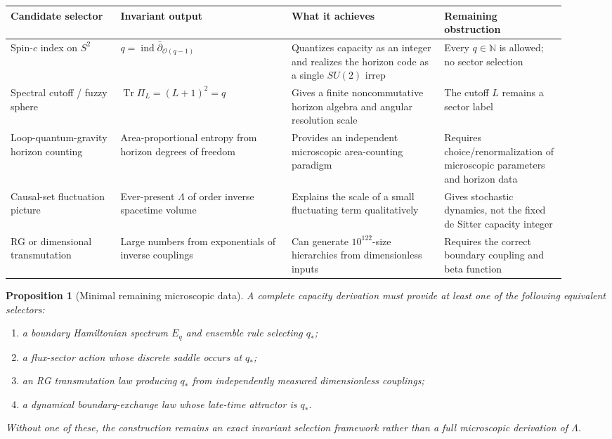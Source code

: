 \documentclass[aps,prd,reprint,nofootinbib,superscriptaddress,floatfix]{revtex4-2}
\numberwithin{equation}{section}
\theoremstyle{definition}
\theoremstyle{plain}
\newtheorem{proposition}{Proposition}[section]
\begin{document}
\begin{widetext}
\begin{center}
\footnotesize
\renewcommand{\arraystretch}{0.92}
\begin{tabular}{@{}p{0.18\linewidth}p{0.29\linewidth}p{0.25\linewidth}p{0.20\linewidth}@{}}
\toprule
Candidate selector & Invariant output & What it achieves & Remaining obstruction\\
\midrule
Spin-\(c\) index on \(S^2\) &
\(q=\operatorname{ind}\bar\partial_{\mathcal O(q-1)}\) &
Quantizes capacity as an integer and realizes the horizon code as a single \(SU(2)\) irrep &
Every \(q\in\mathbb N\) is allowed; no sector selection\\
Spectral cutoff / fuzzy sphere &
\(\operatorname{Tr}\Pi_L=(L+1)^2=q\) &
Gives a finite noncommutative horizon algebra and angular resolution scale &
The cutoff \(L\) remains a sector label\\
Loop-quantum-gravity horizon counting &
Area-proportional entropy from horizon degrees of freedom &
Provides an independent microscopic area-counting paradigm &
Requires choice/renormalization of microscopic parameters and horizon data\\
Causal-set fluctuation picture &
Ever-present \(\Lambda\) of order inverse spacetime volume &
Explains the scale of a small fluctuating term qualitatively &
Gives stochastic dynamics, not the fixed de Sitter capacity integer\\
RG or dimensional transmutation &
Large numbers from exponentials of inverse couplings &
Can generate \(10^{122}\)-size hierarchies from dimensionless inputs &
Requires the correct boundary coupling and beta function\\
\bottomrule
\end{tabular}
\end{center}
\end{widetext}

\begin{proposition}[Minimal remaining microscopic data]
A complete capacity derivation must provide at least one of the following equivalent selectors:
\begin{enumerate}
\item a boundary Hamiltonian spectrum \(E_q\) and ensemble rule selecting \(q_*\);
\item a flux-sector action whose discrete saddle occurs at \(q_*\);
\item an RG transmutation law producing \(q_*\) from independently measured dimensionless couplings;
\item a dynamical boundary-exchange law whose late-time attractor is \(q_*\).
\end{enumerate}
Without one of these, the construction remains an exact invariant selection framework rather than a full microscopic derivation of \(\Lambda\).
\end{proposition}
\end{document}
